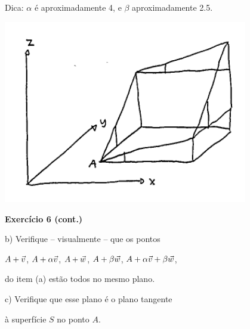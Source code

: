 \documentclass[oneside,12pt]{article}
\begin{document}
Dica: $α$ é aproximadamente 4, e $β$ aproximadamente 2.5.

\newpage

\includegraphics[height=8cm]{2020-2-C3/20210428_C3_exercicio_10.pdf}


\newpage

{\bf Exercício 6 (cont.)}

\msk

b) Verifique -- visualmente -- que os pontos

$A+{\vec v}$, $A+\alpha{\vec v}$, $A+{\vec w}$, $A+\beta{\vec w}$, $A+\alpha{\vec v}+\beta{\vec w}$, 

do item (a) estão todos no mesmo plano.

\msk

c) Verifique que esse plano é o plano tangente

à superfície $S$ no ponto $A$.








\end{document}
